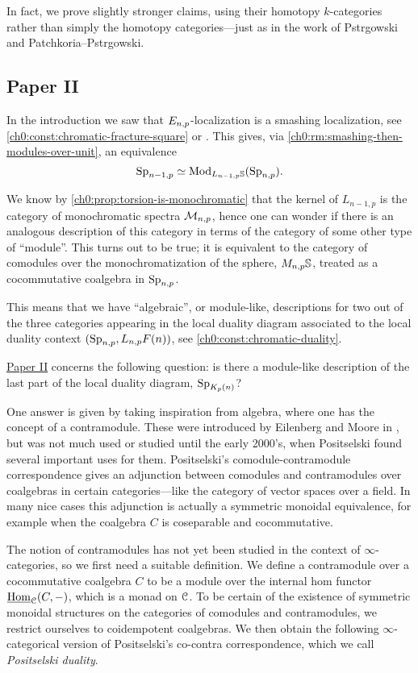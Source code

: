 In fact, we prove slightly stronger claims, using their homotopy $k$-categories rather than simply the homotopy categories---just as in the work of Pstr\a{}gowski and Patchkoria--Pstr\a{}gowski. 








\subsection{Paper II}

In the introduction we saw that $E_{n,p}$-localization is a smashing localization, see \cref{ch0:const:chromatic-fracture-square} or \cite[7.5.6]{ravenel_92}. This gives, via \cref{ch0:rm:smashing-then-modules-over-unit}, an equivalence 
\[\mathrm{Sp}_{n-1,p} \simeq \mathrm{Mod}_{L_{n-1,p}\mathbb{S}}(\mathrm{Sp}_{n,p}).\]

We know by \cref{ch0:prop:torsion-is-monochromatic} that the kernel of $L_{n-1,p}$ is the category of monochromatic spectra $\mathcal{M}_{n,p}$, hence one can wonder if there is an analogous description of this category in terms of the category of some other type of ``module''. This turns out to be true; it is equivalent to the category of comodules over the monochromatization of the sphere, $M_{n,p} \mathbb{S}$, treated as a cocommutative coalgebra in $\mathrm{Sp}_{n,p}$. 

This means that we have ``algebraic'', or module-like, descriptions for two out of the three categories appearing in the local duality diagram associated to the local duality context $(\mathrm{Sp}_{n,p}, L_{n,p} F(n))$, see \cref{ch0:const:chromatic-duality}. 

\hyperref[ch2]{Paper II} concerns the following question: is there a module-like description of the last part of the local duality diagram, $\mathrm{Sp}_{K_p(n)}$? 

One answer is given by taking inspiration from algebra, where one has the concept of a contramodule. These were introduced by Eilenberg and Moore in \cite{eilenberg-moore_65}, but was not much used or studied until the early 2000's, when Positselski found several important uses for them. Positselski's comodule-contramodule correspondence gives an adjunction between comodules and contramodules over coalgebras in certain categories---like the category of vector spaces over a field. In many nice cases this adjunction is actually a symmetric monoidal equivalence, for example when the coalgebra $C$ is coseparable and cocommutative. 

The notion of contramodules has not yet been studied in the context of $\infty$-categories, so we first need a suitable definition. We define a contramodule over a cocommutative coalgebra $C$ to be a module over the internal hom functor $\operatorname{\underline{Hom}}_{\EuScript{C}}(C,-)$, which is a monad on $\EuScript{C}$. To be certain of the existence of symmetric monoidal structures on the categories of comodules and contramodules, we restrict ourselves to coidempotent coalgebras. We then obtain the following $\infty$-categorical version of Positselski's co-contra correspondence, which we call \emph{Positselski duality}. 

